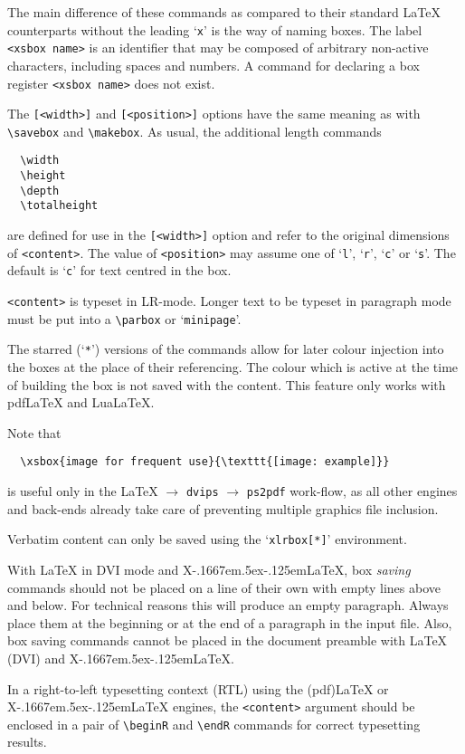\documentclass[a4paper]{article}
\def\XeLaTeX{X\kern-.1667em\lower.5ex\hbox{\reflectbox{E}}\kern-.125em\LaTeX}
\begin{document}
The main difference of these commands as compared to their standard \LaTeX{} counterparts without the leading `\verb+x+' is the way of naming boxes. The label \verb+<xsbox name>+ is an identifier that may be composed of arbitrary non-active characters, including spaces and numbers. A command for declaring a box register \verb+<xsbox name>+ does not exist.

The \verb+[<width>]+ and \verb+[<position>]+ options have the same meaning as with \verb+\savebox+ and \verb+\makebox+. As usual, the additional length commands
\begin{Verbatim}
  \width
  \height
  \depth
  \totalheight
\end{Verbatim}
are defined for use in the \verb+[<width>]+ option and refer to the original dimensions of \verb+<content>+. The value of \verb+<position>+ may assume one of `\verb+l+', `\verb+r+', `\verb+c+' or `\verb+s+'. The default is `\verb+c+' for text centred in the box.

\verb+<content>+ is typeset in LR-mode. Longer text to be typeset in paragraph mode must be put into a \verb+\parbox+ or `\verb+minipage+'.

The starred (`\verb+*+') versions of the commands allow for later colour injection into the boxes at the place of their referencing. The colour which is active at the time of building the box is not saved with the content. This feature only works with pdf\LaTeX{} and Lua\LaTeX.

Note that
\begin{Verbatim}
  \xsbox{image for frequent use}{\texttt{[image: example]}}  
\end{Verbatim}
is useful only in the \LaTeX{} $\rightarrow$ \verb+dvips+ $\rightarrow$ \verb+ps2pdf+ work-flow, as all other engines and back-ends already take care of preventing multiple graphics file inclusion.

Verbatim content can only be saved using the `\verb+xlrbox[*]+' environment.

With \LaTeX{} in DVI mode and \XeLaTeX, box \emph{saving} commands should not be placed on a line of their own with empty lines above and below. For technical reasons this will produce an empty paragraph. Always place them at the beginning or at the end of a paragraph in the input file. Also, box saving commands cannot be placed in the document preamble with \LaTeX{} (DVI) and \XeLaTeX{}.

In a right-to-left typesetting context (RTL) using the (pdf)\LaTeX{} or \XeLaTeX{} engines, the \verb+<content>+ argument should be enclosed in a pair of \verb+\beginR+ and \verb+\endR+ commands for correct typesetting results.
\end{document}
